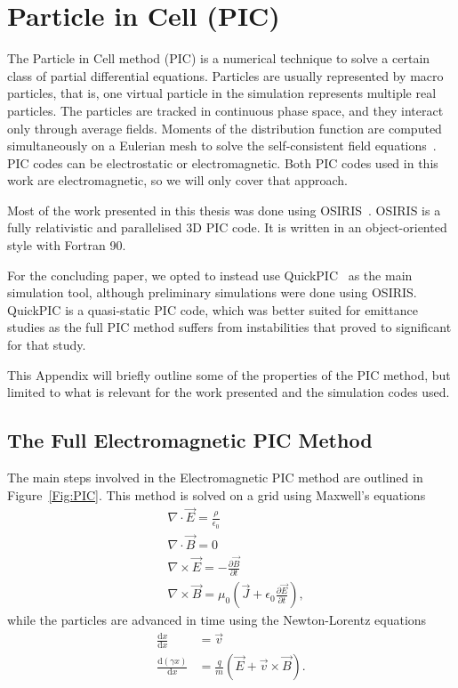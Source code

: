%
%

\chapter{Particle in Cell (PIC)}
\label{Apx:PIC}

The Particle in Cell method (PIC) is a numerical technique to solve a certain class of partial differential equations.
Particles are usually represented by macro particles, that is, one virtual particle in the simulation represents multiple real particles.
The particles are tracked in continuous phase space, and they interact only through average fields.
Moments of the distribution function are computed simultaneously on a Eulerian mesh to solve the self-consistent field equations~\cite{hatzky:2010}.
PIC codes can be electrostatic or electromagnetic.
Both PIC codes used in this work are electromagnetic, so we will only cover that approach.

Most of the work presented in this thesis was done using OSIRIS~\cite{fonseca:2002, add:fonseca:2017}.
OSIRIS is a fully relativistic and parallelised 3D PIC code.
It is written in an object-oriented style with Fortran 90.

For the concluding paper, we opted to instead use QuickPIC~\cite{an:2013, huang:2006} as the main simulation tool, although preliminary simulations were done using OSIRIS.
QuickPIC is a quasi-static PIC code, which was better suited for emittance studies as the full PIC method suffers from instabilities that proved to significant for that study.

This Appendix will briefly outline some of the properties of the PIC method, but limited to what is relevant for the work presented and the simulation codes used.

\section{The Full Electromagnetic PIC Method}
\label{PIC:EM}

The main steps involved in the Electromagnetic PIC method are outlined in Figure~\ref{Fig:PIC}.
This method is solved on a grid using Maxwell's equations
\begin{align}
    &\nabla\cdot\vec{E}  = \frac{\rho}{\epsilon_0} \\
    &\nabla\cdot\vec{B}  = 0 \\
    &\nabla\times\vec{E} = -\frac{\partial\vec{B}}{\partial t} \\
    &\nabla\times\vec{B} = \mu_0\left(\vec{J} + \epsilon_0\frac{\partial\vec{E}}{\partial t}\right),
\end{align}
while the particles are advanced in time using the Newton-Lorentz equations
\begin{align}
    \frac{\mathrm{d}x}{\mathrm{d}x} &= \vec{v} \\
    \frac{\mathrm{d}(\gamma x)}{\mathrm{d}x} &= \frac{q}{m}\left(\vec{E}+\vec{v}\times\vec{B}\right).
\end{align}

